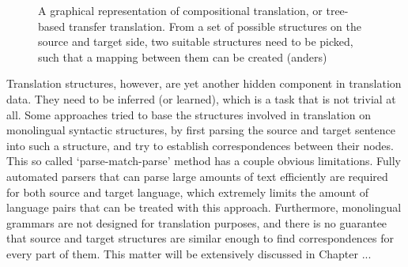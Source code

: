 \documentclass{report}
\theoremstyle{definition}
\theoremstyle{plain}
\begin{document}
\begin{figure}
\centering
{}
\caption{A graphical representation of compositional translation, or tree-based transfer translation. From a set of possible structures on the source and target side, two suitable structures need to be picked, such that a mapping between them can be created (anders)}\label{fig:comptrans}
\end{figure}

Translation structures, however, are yet another hidden component in translation data. They need to be inferred (or learned), which is a task that is not trivial at all. Some approaches tried to base the structures involved in translation on monolingual syntactic structures, by first parsing the source and target sentence into such a structure, and try to establish correspondences between their nodes. This so called `parse-match-parse' method has a couple obvious limitations. Fully automated parsers that can parse large amounts of text efficiently are required for both source and target language, which extremely limits the amount of language pairs that can be treated with this approach. Furthermore, monolingual grammars are not designed for translation purposes, and there is no guarantee that source and target structures are similar enough to find correspondences for every part of them. This matter will be extensively discussed in Chapter ...
\end{document}
